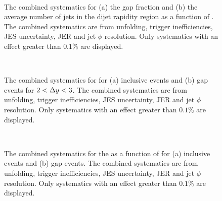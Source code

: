 \begin{figure}
\centering
\mbox{
              \quad
              \quad
                              }
\caption[Combined systematics for the gap fraction and average number of jets]{
The combined systematics for (a) the gap fraction and (b) the average number of jets in the dijet rapidity region as a function of \dy{}.
The combined systematics are from unfolding, trigger inefficiencies, JES uncertainty, JER and jet $\phi$ resolution.
Only systematics with an effect greater than $0.1\%$ are displayed.
\label{GBJ2:SysComb:GapNjet}}
\end{figure}
\begin{figure}
\centering
\mbox{
              \quad
              \quad
                              }

\caption[Combined systematics for \dphiDist{}]{
The combined systematics for \dphiDist{}  for (a) inclusive events and (b) gap events for  $2<\mbox{$\Delta y$}{}<3$.
The combined systematics are from unfolding, trigger inefficiencies, JES uncertainty, JER and jet $\phi$ resolution.
Only systematics with an effect greater than $0.1\%$ are displayed.
\label{GBJ2:SysComb:dphi23}}
\end{figure}


\begin{figure}
\centering
\mbox{
              \quad
              \quad
                              }
\caption[Combined systematics for \mean{\costwodphi{}}]{
The combined systematics for the \mean{\costwodphi{}} as a function of \dy{}  for (a) inclusive events and (b) gap events.
The combined systematics are from unfolding, trigger inefficiencies, JES uncertainty, JER and jet $\phi$ resolution.
Only systematics with an effect greater than $0.1\%$ are displayed.
\label{GBJ2:SysComb:cos2}}
\end{figure}

